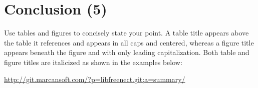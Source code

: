 \documentclass[12pt, letterpaper]{article}
\begin{document}
\section{Conclusion (5)}
Use tables and figures to concisely state your point. A table title appears above the table it references and appears in all caps and centered, whereas a figure title appears beneath the figure and with only leading capitalization. Both table and figure titles are italicized as shown in the examples below:



\begin{thebibliography}{10}
 \url{http://git.marcansoft.com/?p=libfreenect.git;a=summary/}
\end{thebibliography}
\end{document}
